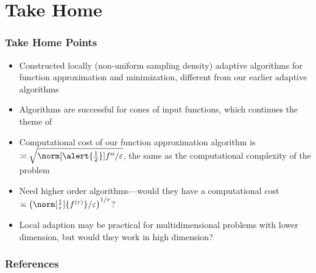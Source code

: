 \documentclass[12pt,compress,xcolor={usenames,dvipsnames}]{beamer} %
\begin{document}
\section{Take Home}
\begin{frame}[allowframebreaks]
	\frametitle{Take Home Points }
\begin{itemize}
	\item Constructed \alert{locally} (non-uniform sampling density) adaptive algorithms for function approximation and minimization, different from our earlier adaptive algorithms \cite{HicEtal14b}
	
	\item Algorithms are successful for \alert{cones} of input functions, which continues the theme of \cites{HicEtal14a,HicEtal14b,Ton14a,Din15a,Jia16a}
	
	\item Computational cost of our function approximation algorithm is $\asymp \sqrt{\norm[\alert{\frac12}]{f''}/\varepsilon}$, the same as the computational complexity of the problem
	
	\item Need \alert{higher order} algorithms---would they have a computational cost $\asymp \left(\norm[\frac1r]{f^{(r)}}/\varepsilon\right)^{1/r}$?
	
	\item Local adaption may be practical for \alert{multidimensional} problems with lower dimension, but would they work in high dimension?
	
	\end{itemize}
	
\end{frame}

\begin{frame}[allowframebreaks]\frametitle{References}
	
\end{frame}
\end{document}
